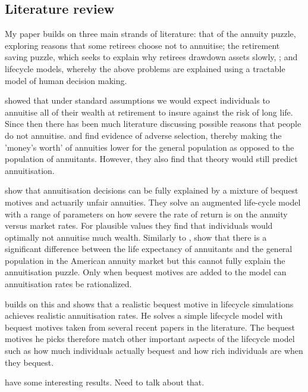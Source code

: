 \documentclass[12pt]{article}
\begin{document}
\subsection{Literature review}
My paper builds on three main strands of literature: that of the annuity puzzle,
exploring reasons that some retirees choose not to annuitise; the retirement
saving puzzle, which seeks to explain why retirees drawdown assets slowly, ; and
lifecycle models, whereby the above problems are explained using a tractable
model of human decision making.

\cite{yaari_65} showed that under standard assumptions we would expect
individuals to annuitise all of their wealth at retirement to insure against the
risk of long life. Since then there has been much literature discussing possible
reasons that people do not annuitise. \cite{finkelstein_porteba_2002} and
\cite{finkelstein_porteba_2004} find evidence of adverse selection, thereby
making the 'money's worth' of annuities lower for the general population as
opposed to the population of annuitants. However, they also find that theory
would still predict annuitisation.

\cite{friedman_warshawsky_qje_1990} show that annuitisation decisions can be
fully explained by a mixture of bequest motives and actuarily unfair annuities.
They solve an augmented life-cycle model with a range of parameters on how
severe the rate of return is on the annuity versus market rates. For plausible
values they find that individuals would optimally not annuitise much wealth.
Similarly to \cite{finkelstein_porteba_2004},
\cite{friedman_warshawsky_chicago_1988} show that there is a significant
difference between the life expectancy of annuitants and the general population
in the American annuity market but this cannot fully explain the annuitisation
puzzle. Only when bequest motives are added to the model can annuitisation rates
be rationalized.

\cite{lockwood_red_2012} builds on this and shows that a realistic bequest
motive in lifecycle simulations achieves realistic annuitisation rates. He
solves a simple lifecycle model with bequest motives taken from several recent
papers in the literature. The bequest motives he picks therefore match other
important aspects of the lifecycle model such as how much individuals actually
bequest and how rich individuals are when they bequest.

\cite{lockwood_aer_2018}

\cite{vidalmelia_lejarragagarcia_munich_2004} have some interesting results.
Need to talk about that.
\end{document}

